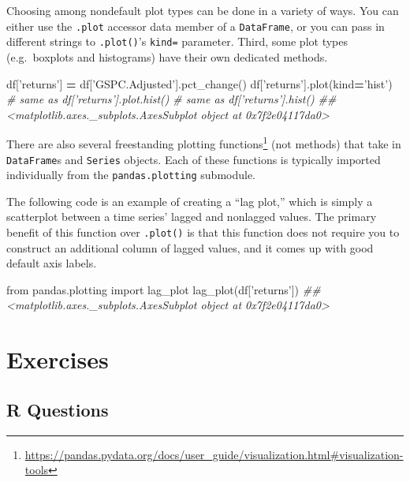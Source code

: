\documentclass[12pt,krantz2]{krantz}
\makeatletter
\newenvironment{Shaded}{\begin{snugshade}}{\end{snugshade}}
\newcommand{\CommentTok}[1]{\textcolor[rgb]{0.37,0.37,0.37}{\textit{#1}}}
\newcommand{\ImportTok}[1]{#1}
\newcommand{\NormalTok}[1]{#1}
\newcommand{\OperatorTok}[1]{\textcolor[rgb]{0.43,0.43,0.43}{\textbf{#1}}}
\newcommand{\StringTok}[1]{\textcolor[rgb]{0.5,0.5,0.5}{#1}}
\renewcommand{\href}[2]{#2\footnote{\url{#1}}}
\newenvironment{kframe}{%
\medskip{}
\setlength{\fboxsep}{.8em}
 \def\at@end@of@kframe{}%
 \ifinner\ifhmode%
  \def\at@end@of@kframe{\end{minipage}}%
  \begin{minipage}{\columnwidth}%
 \fi\fi%
 \def\FrameCommand##1{\hskip\@totalleftmargin \hskip-\fboxsep
 \colorbox{shadecolor}{##1}\hskip-\fboxsep
     \hskip-\linewidth \hskip-\@totalleftmargin \hskip\columnwidth}%
 \MakeFramed {\advance\hsize-\width
   \@totalleftmargin\z@ \linewidth\hsize
   \@setminipage}}%
 {\par\unskip\endMakeFramed%
 \at@end@of@kframe}
\renewenvironment{Shaded}{\begin{kframe}}{\end{kframe}}
\makeatother
\begin{document}
Choosing among nondefault plot types can be done in a variety of ways. You can either use the \texttt{.plot} accessor data member of a \texttt{DataFrame}, or you can pass in different strings to \texttt{.plot()}'s \texttt{kind=} parameter. Third, some plot types (e.g.~boxplots and histograms) have their own dedicated methods.

\begin{Shaded}
\begin{Highlighting}[]
\NormalTok{df[}\StringTok{'returns'}\NormalTok{] }\OperatorTok{=}\NormalTok{ df[}\StringTok{'GSPC.Adjusted'}\NormalTok{].pct_change()}
\NormalTok{df[}\StringTok{'returns'}\NormalTok{].plot(kind}\OperatorTok{=}\StringTok{'hist'}\NormalTok{)}
\CommentTok{# same as df['returns'].plot.hist()}
\CommentTok{# same as df['returns'].hist()}
\CommentTok{## <matplotlib.axes._subplots.AxesSubplot object at 0x7f2e04117da0>}
\end{Highlighting}
\end{Shaded}

There are also \href{https://pandas.pydata.org/docs/user_guide/visualization.html\#visualization-tools}{several freestanding plotting functions} (not methods) that take in \texttt{DataFrame}s and \texttt{Series} objects. Each of these functions is typically imported individually from the \texttt{pandas.plotting} submodule.

The following code is an example of creating a ``lag plot,'' which is simply a scatterplot between a time series' lagged and nonlagged values. The primary benefit of this function over \texttt{.plot()} is that this function does not require you to construct an additional column of lagged values, and it comes up with good default axis labels.

\begin{Shaded}
\begin{Highlighting}[]
\ImportTok{from}\NormalTok{ pandas.plotting }\ImportTok{import}\NormalTok{ lag_plot}
\NormalTok{lag_plot(df[}\StringTok{'returns'}\NormalTok{])}
\CommentTok{## <matplotlib.axes._subplots.AxesSubplot object at 0x7f2e04117da0>}
\end{Highlighting}
\end{Shaded}

\hypertarget{exercises-11}{%
\section{Exercises}\label{exercises-11}}

\hypertarget{r-questions-10}{%
\subsection{R Questions}\label{r-questions-10}}
\end{document}
